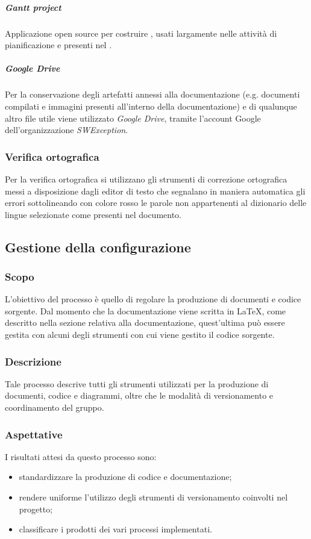 \subparagraph{\textit{Gantt project}}
Applicazione open source per costruire , usati largamente nelle attività di pianificazione e presenti nel .

\subparagraph{\textit{Google Drive}}
Per la conservazione degli artefatti annessi alla documentazione (e.g. documenti compilati e immagini presenti all'interno della documentazione) e di qualunque altro file utile viene utilizzato \textit{Google Drive}, tramite l'account Google dell'organizzazione \textit{SWException}.

\subsubsection{Verifica ortografica}
Per la verifica ortografica si utilizzano gli strumenti di correzione ortografica messi a disposizione dagli editor di testo che segnalano in maniera automatica gli errori sottolineando con colore rosso le parole non appartenenti al dizionario delle lingue selezionate come presenti nel documento.

\subsection{Gestione della configurazione} \label{_gestioneDellaConfigurazione}
\subsubsection{Scopo}
L'obiettivo del processo è quello di regolare la produzione di documenti e codice sorgente.
Dal momento che la documentazione viene scritta in \LaTeX, come descritto nella sezione relativa
alla documentazione, quest'ultima può essere gestita con alcuni degli strumenti con
cui viene gestito il codice sorgente.

\subsubsection{Descrizione}
Tale processo descrive tutti gli strumenti utilizzati per la produzione di documenti, codice e diagrammi,
oltre che le modalità di versionamento e coordinamento del gruppo.

\subsubsection{Aspettative}
I risultati attesi da questo processo sono:
\begin{itemize}
    \item standardizzare la produzione di codice e documentazione;
    \item rendere uniforme l'utilizzo degli strumenti di versionamento coinvolti nel progetto;
    \item classificare i prodotti dei vari processi implementati.
\end{itemize}

